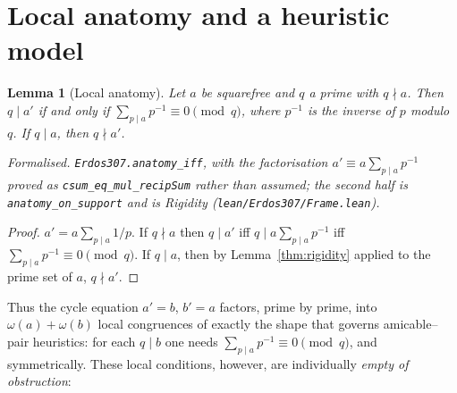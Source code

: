\documentclass[11pt]{article}
\newtheorem{lemma}[theorem]{Lemma}
\theoremstyle{definition}
\begin{document}
\section{Local anatomy and a heuristic model}\label{sec:anatomy}

\begin{lemma}[Local anatomy]\label{lem:anatomy}
Let $a$ be squarefree and $q$ a prime with $q\nmid a$. Then $q\mid a'$ if and only if
$\sum_{p\mid a}p^{-1}\equiv 0\pmod q$, where $p^{-1}$ is the inverse of $p$ modulo $q$. If $q\mid a$,
then $q\nmid a'$.

\textup{Formalised.} \texttt{Erdos307.anatomy\_iff}, with the factorisation
$a'\equiv a\sum_{p\mid a}p^{-1}$ proved as \texttt{csum\_eq\_mul\_recipSum} rather than assumed; the
second half is \texttt{anatomy\_on\_support} and is Rigidity
\textup{(\texttt{lean/Erdos307/Frame.lean})}.
\end{lemma}
\begin{proof}
$a'=a\sum_{p\mid a}1/p$. If $q\nmid a$ then $q\mid a'$ iff $q\mid a\sum_{p\mid a}p^{-1}$ iff
$\sum_{p\mid a}p^{-1}\equiv0\pmod q$. If $q\mid a$, then by Lemma~\ref{thm:rigidity}
applied to the prime set of $a$, $q\nmid a'$.
\end{proof}

Thus the cycle equation $a'=b$, $b'=a$ factors, prime by prime, into
$\omega(a)+\omega(b)$ local congruences of exactly the shape that governs amicable--pair heuristics:
for each $q\mid b$ one needs $\sum_{p\mid a}p^{-1}\equiv0\pmod q$, and symmetrically. These local
conditions, however, are individually \emph{empty of obstruction}:
\end{document}
